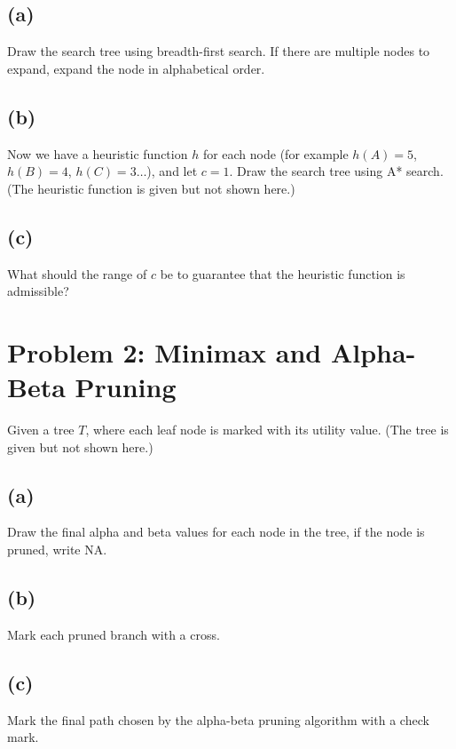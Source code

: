 \documentclass[a4paper,12pt]{article}
\begin{document}
\subsection*{(a)}

Draw the search tree using breadth-first search. If there are multiple nodes to expand, expand the node in alphabetical order.

\subsection*{(b)}

Now we have a heuristic function $h$ for each node (for example $h(A) = 5$, $h(B) = 4$, $h(C) = 3 \ldots$), and let $c = 1$. Draw the search tree using A* search. (The heuristic function is given but not shown here.)

\subsection*{(c)}

What should the range of $c$ be to guarantee that the heuristic function is admissible?

\section*{Problem 2: Minimax and Alpha-Beta Pruning}

Given a tree $T$, where each leaf node is marked with its utility value. (The tree is given but not shown here.)

\subsection*{(a)}

Draw the final alpha and beta values for each node in the tree, if the node is pruned, write NA.

\subsection*{(b)}

Mark each pruned branch with a cross.

\subsection*{(c)}

Mark the final path chosen by the alpha-beta pruning algorithm with a check mark.
\end{document}
